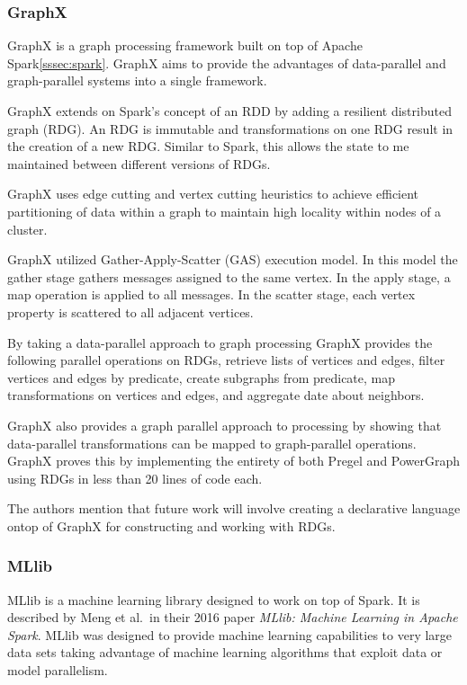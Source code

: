 \documentclass[]{article}
\begin{document}
\subsubsection{GraphX}\label{sssec:graphx}
GraphX\cite{xin_graphx:_2013} is a graph processing framework built on top of Apache Spark\ref{sssec:spark}. GraphX aims to provide the advantages of data-parallel and graph-parallel systems into a single framework.

GraphX extends on Spark's concept of an RDD by adding a resilient distributed graph (RDG). An RDG is immutable and transformations on one RDG result in the creation of a new RDG. Similar to Spark, this allows the state to me maintained between different versions of RDGs.

GraphX uses edge cutting and vertex cutting heuristics to achieve efficient partitioning of data within a graph to maintain high locality within nodes of a cluster.

GraphX utilized Gather-Apply-Scatter (GAS) execution model. In this model the gather stage gathers messages assigned to the same vertex. In the apply stage, a map operation is applied to all messages. In the scatter stage, each vertex property is scattered to all adjacent vertices.

By taking a data-parallel approach to graph processing GraphX provides the following parallel operations on RDGs, retrieve lists of vertices and edges, filter vertices and edges by predicate, create subgraphs from predicate, map transformations on vertices and edges, and aggregate date about neighbors.

GraphX also provides a graph parallel approach to processing by showing that data-parallel transformations can be mapped to graph-parallel operations. GraphX proves this by implementing the entirety of both Pregel and PowerGraph using RDGs in less than 20 lines of code each.

The authors mention that future work will involve creating a declarative language ontop of GraphX for constructing and working with RDGs.

\subsubsection{MLlib}\label{sssec:mllib}
MLlib is a machine learning library designed to work on top of Spark. It is described by Meng et al.\ in their 2016 paper \textit{MLlib: Machine Learning in Apache Spark}\cite{meng2016mllib}. MLlib was designed to provide machine learning capabilities to very large data sets taking advantage of machine learning algorithms that exploit data or model parallelism.
\end{document}

